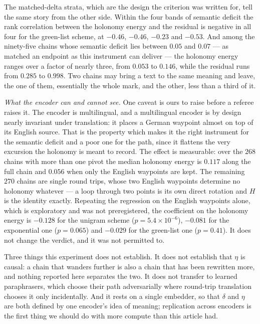 \documentclass{article}
\theoremstyle{plain}
\theoremstyle{definition}
\numberwithin{equation}{section}
\begin{document}
The matched-delta strata, which are the design the criterion was written
for, tell the same story from the other side. Within the four bands of
semantic deficit the rank correlation between the holonomy energy and
the residual is negative in all four for the green-list scheme, at
$-0.46$, $-0.46$, $-0.23$ and $-0.53$. And among the ninety-five chains
whose semantic deficit lies between $0.05$ and $0.07$ --- as matched an
endpoint as this instrument can deliver --- the holonomy energy ranges
over a factor of nearly three, from $0.053$ to $0.146$, while the
residual runs from $0.285$ to $0.998$. Two chains may bring a text to
the same meaning and leave, the one of them, essentially the whole mark,
and the other, less than a third of it.

\medskip
\noindent\emph{What the encoder can and cannot see.}
One caveat is ours to raise before a referee raises it. The encoder is
multilingual, and a multilingual encoder is by design nearly invariant
under translation: it places a German waypoint almost on top of its
English source. That is the property which makes it the right instrument
for the semantic deficit and a poor one for the path, since it flattens
the very excursion the holonomy is meant to record. The effect is
measurable: over the $268$ chains with more than one pivot the median
holonomy energy is $0.117$ along the full chain and $0.056$ when only
the English waypoints are kept. The remaining $270$ chains are single
round trips, whose two English waypoints determine no holonomy whatever
--- a loop through two points is its own direct rotation and $H$ is the
identity exactly. Repeating the regression on the English waypoints
alone, which is exploratory and was not preregistered, the coefficient
on the holonomy energy is $-0.128$ for the unigram scheme
($p = 5.4\times10^{-6}$), $-0.081$ for the exponential one
($p = 0.065$) and $-0.029$ for the green-list one ($p = 0.41$). It does
not change the verdict, and it was not permitted to.

Three things this experiment does not establish. It does not establish
that $\eta$ is causal: a chain that wanders further is also a chain that
has been rewritten more, and nothing reported here separates the two. It
does not transfer to learned paraphrasers, which choose their path
adversarially where round-trip translation chooses it only
incidentally. And it rests on a single embedder, so that $\delta$ and
$\eta$ are both defined by one encoder's idea of meaning; replication
across encoders is the first thing we should do with more compute than
this article had.
\end{document}
